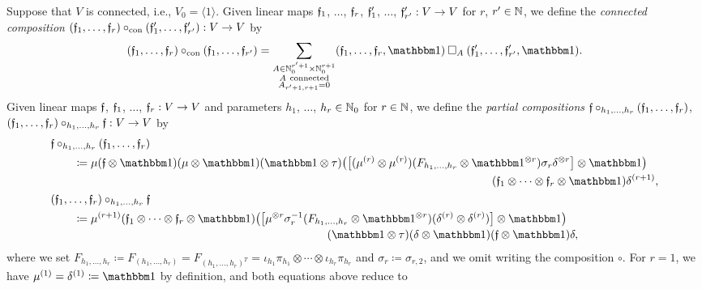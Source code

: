 \documentclass[\MainFolder/Text.tex]{subfiles}
\begin{document}
\begin{Definition}
Suppose that $V$ is connected, i.e., $V_0 = \langle 1\rangle$. Given linear maps $\mathfrak{f}_1$, $\dotsc$, $\mathfrak{f}_r$, $\mathfrak{f}_1'$, $\dotsc$, $\mathfrak{f}_{r'}': V\rightarrow V$ for $r$, $r'\in \mathbb{N}$, we define the \emph{connected composition} $(\mathfrak{f}_1, \dotsc, \mathfrak{f}_r)\circ_{\mathrm{con}}(\mathfrak{f}_1',\dotsc,\mathfrak{f}_{r'}'): V \rightarrow V$ by
$$ (\MVMorF_1, \dotsc, \MVMorF_r)\circ_{\mathrm{con}}(\MVMorF_1,\dotsc,\MVMorF_{r'}) = \sum_{\substack{A\in \N_0^{r'+1}\times\N_0^{r+1}\\ A\  \mathrm{connected} \\ A_{r'+1,r+1} = 0 }} (\MVMorF_1,\dotsc,\MVMorF_r,\Id)\SquareComp_A (\MVMorF_1',\dotsc,\MVMorF_{r'}',\Id).$$
Given linear maps $\mathfrak{f}$, $\mathfrak{f}_1$, $\dotsc$, $\mathfrak{f}_r: V \rightarrow V$ and parameters $h_1$, $\dotsc$, $h_r\in \mathbb{N}_0$ for $r\in \mathbb{N}$, we define the \emph{partial compositions} $\mathfrak{f}\circ_{h_1, \dotsc, h_r}(\mathfrak{f}_1, \dotsc, \mathfrak{f}_r)$, $(\mathfrak{f}_1, \dotsc, \mathfrak{f}_r)\circ_{h_1, \dotsc, h_r}\mathfrak{f}: V\rightarrow V$ by
\begin{align*}
&\MVMorF\circ_{h_1, \dotsc, h_r}(\MVMorF_1, \dotsc, \MVMorF_r) \\
&\qquad\coloneqq\begin{multlined}[t]\MVProd(\MVMorF\otimes \Id)(\MVProd\otimes\Id)(\Id\otimes \tau)\bigl(\bigl[(\MVProd^{(r)}\otimes \MVProd^{(r)})(F_{h_1,\dotsc,h_r} \otimes \Id^{\otimes r})\sigma_r\MVCoProd^{\otimes r}\bigr] \otimes \Id \bigr)\\(\MVMorF_1\otimes \dotsb \otimes \MVMorF_r\otimes \Id)\MVCoProd^{(r+1)},\end{multlined}\\
&(\MVMorF_1, \dotsc, \MVMorF_r)\circ_{h_1, \dotsc, h_r}\MVMorF\\
&\qquad\coloneqq\begin{multlined}[t]\MVProd^{(r+1)}(\MVMorF_1\otimes\dotsb\otimes\MVMorF_r\otimes\Id) \bigl(\bigl[\MVProd^{\otimes r}\sigma_r^{-1}(F_{h_1,\dotsc,h_r}\otimes\Id^{\otimes r})(\MVCoProd^{(r)}\otimes\MVCoProd^{(r)})\bigr]\otimes\Id\bigr)\\(\Id\otimes\tau)(\MVCoProd\otimes\Id)(\MVMorF\otimes\Id)\MVCoProd,\end{multlined}
\end{align*}
where we set $F_{h_1,\dotsc, h_r} \coloneqq F_{(h_1,\dotsc,h_r)} = F_{(h_1,\dotsc,h_r)^T}=\iota_{h_1}\pi_{h_1} \otimes \dotsb \otimes \iota_{h_r}\pi_{h_r}$ and $\sigma_r \coloneqq \sigma_{r,2}$, and we omit writing the composition $\circ$. For $r=1$, we have $\MVProd^{(1)} = \MVCoProd^{(1)}\coloneqq \Id$ by definition, and both equations above reduce to 

\end{Definition}
\end{document}
